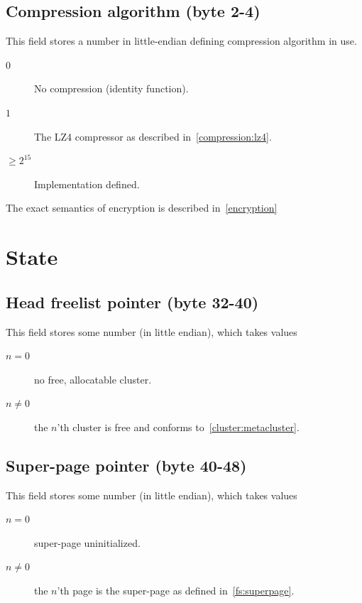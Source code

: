 \documentclass[11pt,a4paper]{report}
\begin{document}
        \subsection{Compression algorithm (byte 2-4)}
        \label{config:compression}
        This field stores a number in little-endian defining compression
        algorithm in use.

        \begin{description}
            \item [$0$] No compression (identity function).
            \item [$1$] The LZ4 compressor as described
                in~\ref{compression:lz4}.
            \item [$\geq 2^{15}$] Implementation defined.
        \end{description}

        The exact semantics of encryption is described in~\ref{encryption}

    \section{State}
        \subsection{Head freelist pointer (byte 32-40)}
        This field stores some number (in little endian), which takes values

        \begin{description}
            \item [$n = 0$]    no free, allocatable cluster.
            \item [$n \neq 0$] the $n$'th cluster is free and conforms
                to~\ref{cluster:metacluster}.
        \end{description}

        \subsection{Super-page pointer (byte 40-48)}
        This field stores some number (in little endian), which takes values

        \begin{description}
            \item [$n = 0$]    super-page uninitialized.
            \item [$n \neq 0$] the $n$'th page is the super-page as
                defined in~\ref{fs:superpage}.
        \end{description}
\end{document}
